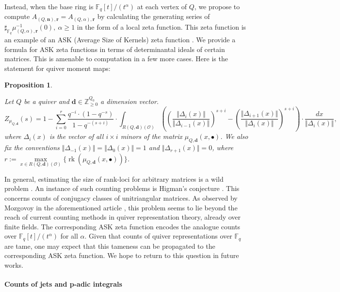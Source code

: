 \documentclass[11pt,english]{article}
\numberwithin{equation}{section}
\numberwithin{figure}{section}
\theoremstyle{definition}
\theoremstyle{plain}
\newtheorem{propintro}[thmintro]{Proposition}
\theoremstyle{remark}
\DeclareMathOperator{\rk}{rk}
\newcommand\dd{\mathbf{d}}
\newcommand\nn{\mathbf{n}}
\newcommand\rr{\mathbf{r}}
\newcommand\ZZ{\mathbb{Z}}
\newcommand\FF{\mathbb{F}}
\begin{document}
Instead, when the base ring is $\FF_{q}[t]/(t^{\alpha})$ at each
vertex of $Q$, we propose to compute $A_{(Q,\nn),\rr}=A_{(Q,\alpha),\rr}$
by calculating the generating series of $\sharp_{\FF_{q}}\mu_{(Q,\alpha),\rr}^{-1}(0),\ \alpha\geq1$
in the form of a local zeta function. This zeta function is an example
of an ASK (Average Size of Kernels) zeta function \cite{Ros18,RV19,Ros20}.
We provide a formula for ASK zeta functions in terms of determinantal
ideals of certain matrices. This is amenable to computation in a few
more cases. Here is the statement for quiver moment maps:

\begin{propintro} \label{Prop/IntroZetaMomMap}

Let $Q$ be a quiver and $\dd\in\ZZ_{\geq0}^{Q_{0}}$ a dimension
vector.\[
Z_{\mu_{Q,\dd}}(s) = 
1-\sum_{i=0}^{r}\frac{q^{-i}\cdot(1-q^{-s})}{1-q^{-(s+i)}}\cdot \int_{R(Q,\dd)(\mathcal{O})} \left(\left(\frac{\Vert\Delta_{i}(x)\Vert}{\Vert\Delta_{i-1}(x)\Vert}\right)^{s+i}-\left(\frac{\Vert\Delta_{i+1}(x)\Vert}{\Vert\Delta_{i}(x)\Vert}\right)^{s+i} \right)\cdot\frac{dx}{\Vert\Delta_{i}(x)\Vert},
\]where $\Delta_{i}(x)$ is the vector of all $i\times i$ minors of
the matrix $\mu_{Q,\dd}(x,\bullet)$. We also fix the conventions
$\Vert\Delta_{-1}(x)\Vert=\Vert\Delta_{0}(x)\Vert=1$ and $\Vert\Delta_{r+1}(x)\Vert=0$,
where $r:=\underset{x\in R(Q,\dd)(\mathcal{O})}{\max}\{\rk(\mu_{Q,\dd}(x,\bullet))\}$.

\end{propintro}

In general, estimating the size of rank-loci for arbitrary matrices
is a wild problem \cite{Ros22}. An instance of such counting problems
is Higman's conjecture \cite{OBV15,Ros18,Ros20}. This concerns counts
of conjugacy classes of unitriangular matrices. As observed by Mozgovoy
in the aforementioned article \cite{Moz19}, this problem seems to
lie beyond the reach of current counting methods in quiver representation
theory, already over finite fields. The corresponding ASK zeta function
encodes the analogue counts over $\FF_{q}[t]/(t^{\alpha})$ for all
$\alpha$. Given that counts of quiver representations over $\FF_{q}$
are tame, one may expect that this tameness can be propagated to the
corresponding ASK zeta function. We hope to return to this question
in future works.

\paragraph*{Counts of jets and p-adic integrals}
\end{document}
